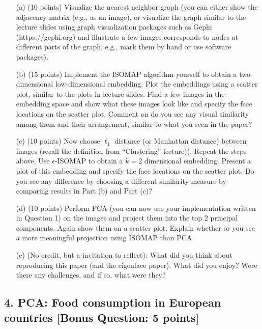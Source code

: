 \documentclass[twoside,10pt]{article}
\begin{document}
\begin{enumerate} 

\item[(a)] (10 points) Visualize the nearest neighbor graph (you can either show the adjacency matrix (e.g., as an image), or visualize the graph similar to the lecture slides using graph visualization packages such as Gephi (\textsf{https://gephi.org}) and illustrate a few images corresponds to nodes at different parts of the graph, e.g., mark them by hand or use software packages).
 
\item[(b)] (15 points) Implement the ISOMAP algorithm yourself to obtain a two-dimensional low-dimensional embedding. Plot the embeddings using a scatter plot, similar to the plots in lecture slides. Find a few images in the embedding space and show what these images look like and specify the face locations on the scatter plot. Comment on do you see any visual similarity among them and their arrangement, similar to what you seen in the paper?

\item[(c)] (10 points) Now choose $\ell_1$ distance (or Manhattan distance) between images (recall the definition from ``Clustering'' lecture)). Repeat the steps above. Use $\epsilon$-ISOMAP to obtain a $k=2$ dimensional embedding. Present a plot of this embedding and specify the face locations on the scatter plot. Do you see any difference by choosing a different similarity measure by comparing results in Part (b) and Part (c)? 

\item[(d)] (10 points) Perform PCA (you can now use your implementation written in Question 1) on the images and project them into the top 2 principal components. Again show them on a scatter plot. Explain whether or you see a more meaningful projection using ISOMAP than PCA. 

\item[(e)] (No credit, but a invitation to reflect): What did you think about reproducing this paper (and the eigenface paper). What did you enjoy? Were there any challenges, and if so, what were they?

\end{enumerate}

\clearpage

\subsection*{4. PCA: Food consumption in European countries [Bonus Question: 5 points]}
\end{document}
